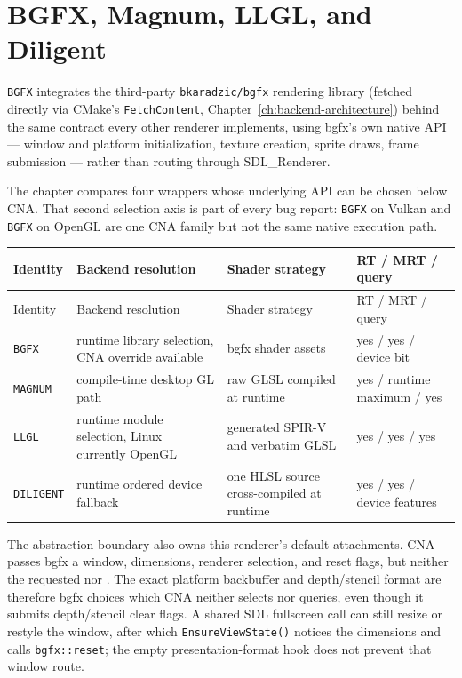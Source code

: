 \chapter{BGFX, Magnum, LLGL, and Diligent}
\label{ch:abstraction-layers-one}
\label{ch:bgfx-backend}

\texttt{BGFX} integrates the third-party \texttt{bkaradzic/bgfx} rendering library (fetched
directly via CMake's \texttt{FetchContent}, Chapter~\ref{ch:backend-architecture}) behind the
same contract every other renderer implements, using bgfx's own native API --- window and
platform initialization, texture creation, sprite draws, frame submission --- rather than
routing through SDL\_Renderer.

The chapter compares four wrappers whose underlying API can be chosen below CNA.  That second
selection axis is part of every bug report: \texttt{BGFX} on Vulkan and \texttt{BGFX} on
OpenGL are one CNA family but not the same native execution path.

\begin{longtable}{p{}p{}p{}p{}}
\toprule
Identity & Backend resolution & Shader strategy & RT / MRT / query \\
\midrule
\endfirsthead
\toprule
Identity & Backend resolution & Shader strategy & RT / MRT / query \\
\midrule
\endhead
\texttt{BGFX} & runtime library selection, CNA override available & bgfx shader assets & yes / yes / device bit \\
\texttt{MAGNUM} & compile-time desktop GL path & raw GLSL compiled at runtime & yes / runtime maximum / yes \\
\texttt{LLGL} & runtime module selection, Linux currently OpenGL & generated SPIR-V and verbatim GLSL & yes / yes / yes \\
\texttt{DILIGENT} & runtime ordered device fallback & one HLSL source cross-compiled at runtime & yes / yes / device features \\
\bottomrule
\end{longtable}

\begin{sourcenote}
The abstraction boundary also owns this renderer's default attachments. CNA passes bgfx a
window, dimensions, renderer selection, and reset flags, but neither the requested
 nor . The exact platform backbuffer and
depth/stencil format are therefore bgfx choices which CNA neither selects nor queries, even
though it submits depth/stencil clear flags. A shared SDL fullscreen call can still resize or
restyle the window, after which \texttt{EnsureViewState()} notices the dimensions and calls
\texttt{bgfx::reset}; the empty presentation-format hook does not prevent that window route.
\end{sourcenote}


